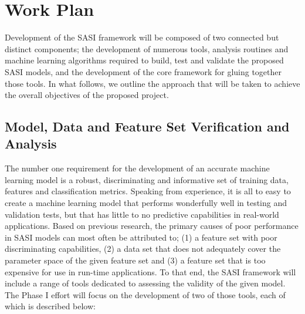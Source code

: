 \section{Work Plan} 
\label{sec:approach}


Development of the SASI framework will be composed of two connected but distinct components; the development of numerous tools, analysis routines and machine learning algorithms required to build, test and validate  the proposed SASI models, and the development of the core framework for gluing together those tools. In what follows, we outline the approach that will be taken to achieve the overall objectives of the proposed project. 

\subsection{ Model, Data and Feature Set Verification and Analysis }
\label{sec:modelvar}
The number one requirement for the development of an accurate machine learning model is a robust, discriminating and informative set of training data, features and classification metrics. Speaking from experience, it is all to easy to create a machine learning model that performs wonderfully well in testing and validation tests, but that has little to no predictive capabilities in real-world applications. Based on previous research, the primary causes of poor performance in SASI models can most often be attributed to; (1) a feature set with poor discriminating capabilities, (2) a data set that does not adequately cover the parameter space of the given feature set and (3) a feature set that is too expensive for use in run-time applications. To that end, the SASI framework will include a range of tools dedicated to assessing the validity of the given model. The Phase I effort will focus on the development of two of those tools, each of which is described below: 

